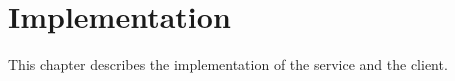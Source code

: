 \chapter{Implementation}
\label{Implementation}
This chapter describes the implementation of the service and the client.

